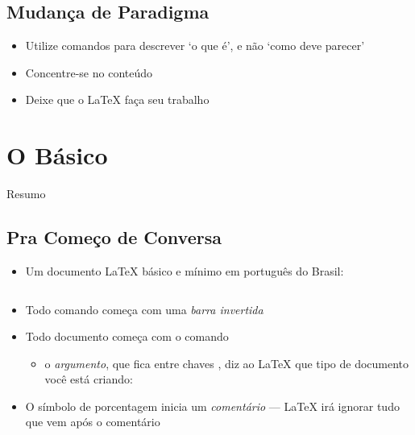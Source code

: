 \documentclass{beamer}
\begin{document}
\subsection{Mudança de Paradigma}
\begin{frame}[fragile]{\insertsubsection}

\begin{itemize}
  \item Utilize comandos para descrever `o que é', e não  `como deve parecer'
  \item Concentre-se no conteúdo
  \item Deixe que o \LaTeX{} faça seu trabalho
\end{itemize}
\end{frame}

\section{O Básico}
\begin{frame}{Resumo}
  \begin{multicols}{2}
  \tableofcontents[currentsection]
  \end{multicols}
\end{frame}
\subsection{Pra Começo de Conversa}
\begin{frame}[fragile]{\insertsubsection}
\begin{itemize}
  \item Um documento \LaTeX{} básico e mínimo em português do Brasil:
  \inputminted[frame=single]{latex}{basics.tex}
  \item Todo comando começa com uma \emph{barra invertida} \keystrokebftt{\bs}
  \item Todo documento começa com o comando 
  \begin{itemize}
    \item o \emph{argumento}, que fica entre chaves \keystrokebftt{\{}\keystrokebftt{\}}, diz ao \LaTeX{} que tipo de documento você está criando: 
  \end{itemize}
  \item O símbolo de porcentagem \keystrokebftt{\%} inicia um \emph{comentário} --- \LaTeX{} irá ignorar tudo que vem após o comentário
\end{itemize}
\end{frame}
\end{document}
